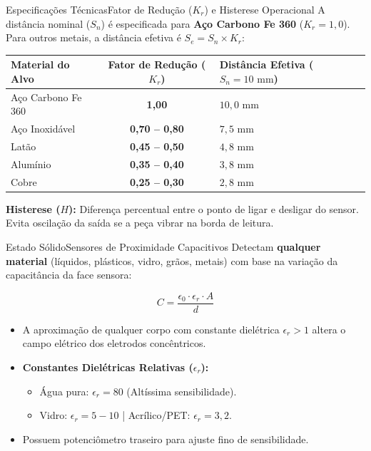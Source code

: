 \begin{senaiframe}{Especificações Técnicas}{Fator de Redução ($K_r$) e Histerese Operacional}
  \small
  A distância nominal ($S_n$) é especificada para \textbf{Aço Carbono Fe 360} ($K_r = 1,0$).  
  Para outros metais, a distância efetiva é $S_e = S_n \times K_r$:

  \vspace{4pt}
  \begin{center}
    \begin{tabular}{|l|c|p{4cm}|}
      \hline
      \textbf{Material do Alvo} & \textbf{Fator de Redução ($K_r$)} & \textbf{Distância Efetiva ($S_n = 10\text{ mm}$)} \\ \hline
      Aço Carbono Fe 360 & \textbf{1,00} & $10,0\text{ mm}$ \\ \hline
      Aço Inoxidável & \textbf{0,70 – 0,80} & $7,5\text{ mm}$ \\ \hline
      Latão & \textbf{0,45 – 0,50} & $4,8\text{ mm}$ \\ \hline
      Alumínio & \textbf{0,35 – 0,40} & $3,8\text{ mm}$ \\ \hline
      Cobre & \textbf{0,25 – 0,30} & $2,8\text{ mm}$ \\ \hline
    \end{tabular}
  \end{center}

  \vspace{2pt}
  \textbf{Histerese ($H$):} Diferença percentual entre o ponto de ligar e desligar do sensor. Evita oscilação da saída se a peça vibrar na borda de leitura.
\end{senaiframe}

\begin{senaiframe}{Estado Sólido}{Sensores de Proximidade Capacitivos}
  Detectam \textbf{qualquer material} (líquidos, plásticos, vidro, grãos, metais) com base na variação da capacitância da face sensora:

  $$C = \frac{\epsilon_0 \cdot \epsilon_r \cdot A}{d}$$

  \begin{itemize}
    \item A aproximação de qualquer corpo com constante dielétrica $\epsilon_r > 1$ altera o campo elétrico dos eletrodos concêntricos.
    \item \textbf{Constantes Dielétricas Relativas ($\epsilon_r$):}
      \begin{itemize}
        \item Água pura: $\epsilon_r = 80$ (Altíssima sensibilidade).
        \item Vidro: $\epsilon_r = 5 - 10$ | Acrílico/PET: $\epsilon_r = 3,2$.
      \end{itemize}
    \item Possuem potenciômetro traseiro para ajuste fino de sensibilidade.
  \end{itemize}
\end{senaiframe}

